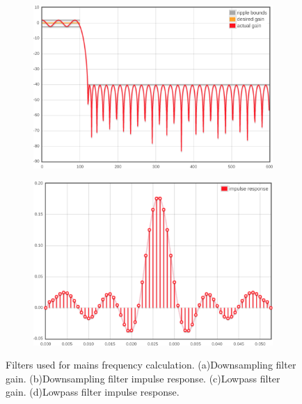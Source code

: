\begin{figure}[h]
	\begin{subfigure}{.5\textwidth}
	  \centering
	  \includegraphics[width=0.9\linewidth]{img/filter2_gain.png}
	  \caption{}
	  \label{fig4:sub3}
	\end{subfigure}%
	\begin{subfigure}{.5\textwidth}
	  \centering
	  \includegraphics[width=0.9\linewidth]{img/filter2_response.png}
	  \caption{}
	  \label{fig4:sub4}
	\end{subfigure}
	\caption{Filters used for mains frequency calculation. (a)Downsampling filter gain. (b)Downsampling filter impulse response. (c)Lowpass filter gain. (d)Lowpass filter impulse response.}
	\label{fig:4}
\end{figure}

